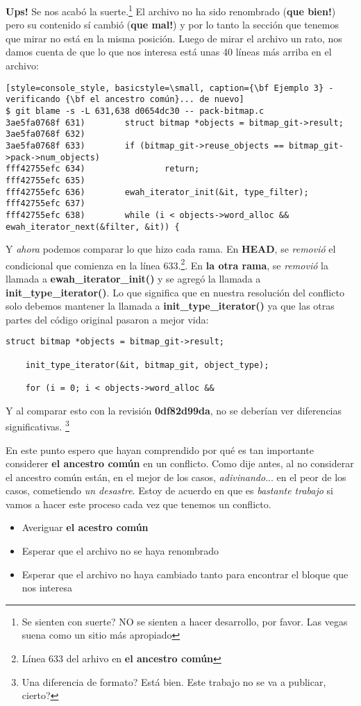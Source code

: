 {\bf Ups!} Se nos acabó la suerte.\footnote{Se sienten con suerte? NO se sienten a hacer desarrollo, por favor. Las vegas suena como un
sitio más apropiado} El archivo no ha sido renombrado ({\bf que bien!}) pero su contenido sí cambió ({\bf que mal!}) y por lo 
tanto la sección que tenemos que mirar no está en la misma posición. Luego de mirar el archivo un rato, nos damos cuenta de que
lo que nos interesa está unas 40 líneas más arriba en el archivo:

\begin{lstlisting}[style=console_style, basicstyle=\small, caption={\bf Ejemplo 3} - verificando {\bf el ancestro común}... de nuevo]
$ git blame -s -L 631,638 d0654dc30 -- pack-bitmap.c
3ae5fa0768f 631)        struct bitmap *objects = bitmap_git->result;
3ae5fa0768f 632) 
3ae5fa0768f 633)        if (bitmap_git->reuse_objects == bitmap_git->pack->num_objects)
fff42755efc 634)                return;
fff42755efc 635) 
fff42755efc 636)        ewah_iterator_init(&it, type_filter);
fff42755efc 637) 
fff42755efc 638)        while (i < objects->word_alloc && ewah_iterator_next(&filter, &it)) {
\end{lstlisting}

Y {\it ahora} podemos comparar lo que hizo cada rama. En {\bf HEAD}, se {\it removió} el condicional que comienza en
la línea 633.\footnote{Línea 633 del arhivo en {\bf el ancestro común}}. En {\bf la otra rama}, se {\it removió} la llamada
a {\bf ewah\_iterator\_init()} y se agregó la llamada a {\bf init\_type\_iterator()}. Lo que significa que en nuestra resolución
del conflicto solo debemos mantener la llamada a {\bf init\_type\_iterator()} ya que las otras partes del código
original pasaron a mejor vida:

\begin{lstlisting}[style=c_style, firstnumber=671, caption={\bf Ejemplo 3} - resolucin final]
	struct bitmap *objects = bitmap_git->result;

	init_type_iterator(&it, bitmap_git, object_type);

	for (i = 0; i < objects->word_alloc &&
\end{lstlisting}

Y al comparar esto con la revisión {\bf 0df82d99da}, no se deberían ver diferencias significativas.
\footnote{Una diferencia de formato? Está bien. Este trabajo no se va a publicar, cierto?}

En este punto espero que hayan comprendido por qué es tan importante considerer {\bf el ancestro común} en un conflicto.
Como dije antes, al no considerar el ancestro común están, en el mejor de los casos, {\it adivinando}... en el peor de los casos,
cometiendo {\it un desastre}. Estoy de acuerdo en que es {\it bastante trabajo} si vamos a hacer este proceso cada vez que tenemos
un conflicto.
\begin{itemize}
	\item Averiguar {\bf el acestro común}
	\item Esperar que el archivo no se haya renombrado
	\item Esperar que el archivo no haya cambiado tanto para encontrar el bloque que nos interesa
\end{itemize}

